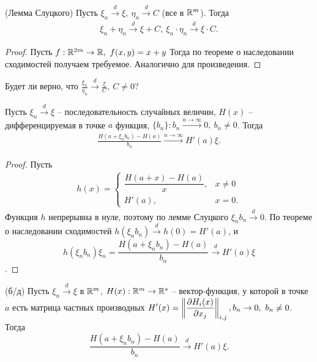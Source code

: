 \begin{corollary}
	(Лемма Слуцкого) Пусть $\xi_n \xrightarrow{d} \xi,\ \eta_n \xrightarrow{d} C$ (все в $\mathbb{R}^m$). Тогда 
	\begin{gather*}
	    \xi_n+\eta_n \xrightarrow{d} \xi + C,\ \xi_n\cdot\eta_n \xrightarrow{d} \xi \cdot C.
	\end{gather*}
\end{corollary}

\begin{proof}
	Пусть $f:\mathbb{R}^{2m}\rightarrow \mathbb{R},\ f(x, y) = x + y$ Тогда по теореме о наследовании сходимостей получаем требуемое. Аналогично для произведения.
\end{proof}

\begin{exercise}
	Будет ли верно, что $\displaystyle \frac{\xi_n}{\eta_n} \xrightarrow{d} \frac{\xi}{C},\ C \ne 0$?
\end{exercise}

\begin{example}
	Пусть $\xi_n \xrightarrow{d} \xi$ -- последовательность случайных величин, $H(x)$ -- дифференцируемая в точке $a$ функция, $\{b_n\}: b_n \xrightarrow{n\rightarrow \infty} 0,\ b_n \ne 0$. Тогда
	\begin{gather*}
	    \frac{H\left(a + \xi_nb_n\right) - H(a)}{b_n}\xrightarrow{n \rightarrow \infty} H'(a)\xi.
	\end{gather*}
\end{example}

\begin{proof}
	Пусть
	\begin{gather*}
	    h( x) =\begin{cases}
		\dfrac{H( a+x) -H( a)}{x}, & x\neq 0\\
		H'( a), & x=0.
	\end{cases}
	\end{gather*}
    Функция $h$ непрерывна в нуле, поэтому по лемме Слуцкого $\xi_nb_n \xrightarrow{d} 0$. По теореме о наследовании сходимостей $\displaystyle h\left(\xi_nb_n\right) \xrightarrow{d} h\left(0\right) = H'(a)$, и
	\begin{equation*}
		h\left(\xi_nb_n\right)\xi_n = \frac{H(a + \xi_nb_n) - H(a)}{b_n} \xrightarrow{d} H'(a)\xi
	\end{equation*}.
\end{proof}

\begin{proposition}
	(б/д) Пусть $\xi_n \xrightarrow{d} \xi$ в $\mathbb{R}^m$, $H(x):\mathbb{R}^m \rightarrow \mathbb{R}^s$ -- вектор-функция, у которой в точке $a$ есть матрица частных производных $\displaystyle H'(x) = \left\Vert\frac{\partial H_i(x)}{\partial x_j}\right\Vert_{i,j},\\ b_n\rightarrow 0,\ b_n \ne 0$. Тогда
	\begin{equation*}
		\frac{H(a + \xi_nb_n) - H(a)}{b_n} \xrightarrow{d} H'(a)\xi.
	\end{equation*}
\end{proposition}
